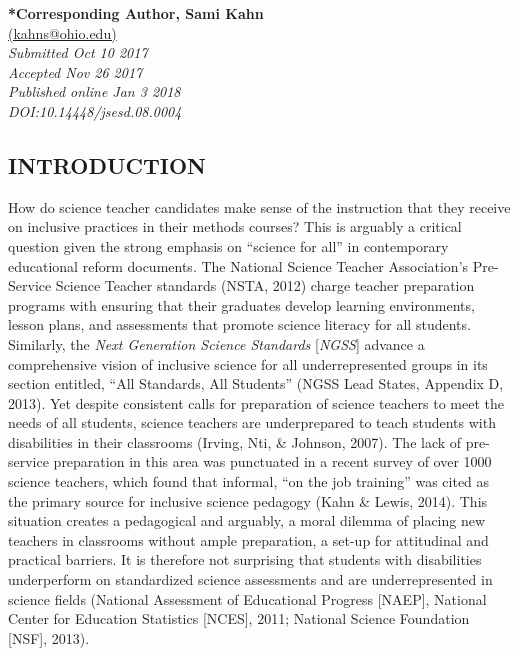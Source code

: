 \documentclass[11.5pt]{sig-alternate} %
\begin{document}

\textbf{*Corresponding Author, Sami Kahn}\\
\href{mailto: kahns@ohio.edu }{(kahns@ohio.edu)} \\
\textit{Submitted  Oct 10 2017 }\\
\textit{Accepted Nov 26 2017} \\
\textit{Published online Jan 3 2018} \\
\textit{DOI:10.14448/jsesd.08.0004} \\
\pagebreak
\clearpage
\begin{large}
\section*{INTRODUCTION}
How do science teacher candidates make sense of the instruction that they receive on inclusive practices in their methods courses? This is arguably a critical question given the strong emphasis on “science for all” in contemporary educational reform documents.  The National Science Teacher Association’s Pre-Service Science Teacher standards (NSTA, 2012) charge teacher preparation programs with ensuring that their graduates develop learning environments, lesson plans, and assessments that promote science literacy for all students. Similarly, the \textit{Next Generation Science Standards} [\textit{NGSS}] advance a comprehensive vision of inclusive science for all underrepresented groups in its section entitled, “All Standards, All Students” (NGSS Lead States, Appendix D, 2013). Yet despite consistent calls for preparation of science teachers to meet the needs of all students, science teachers are underprepared to teach students with disabilities in their classrooms (Irving, Nti, \& Johnson, 2007).  The lack of pre-service preparation in this area was punctuated in a recent survey of over 1000 science teachers, which found that informal, “on the job training” was cited as the primary source for inclusive science pedagogy (Kahn \& Lewis, 2014). This situation creates a pedagogical and arguably, a moral dilemma of placing new teachers in classrooms without ample preparation, a set-up for attitudinal and practical barriers. It is therefore not surprising that students with disabilities underperform on standardized science assessments and are underrepresented in science fields (National Assessment of Educational Progress [NAEP], National Center for Education Statistics [NCES], 2011; National Science Foundation [NSF], 2013).  


\end{large}
\end{document}
